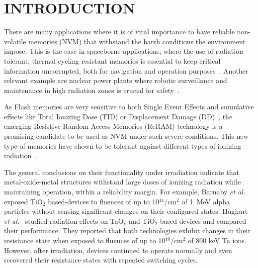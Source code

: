 \documentclass[square,aip,preprint,showkeys,superscriptaddress]{revtex4}
\begin{document}

\maketitle

\section{INTRODUCTION}

There are many applications where it is of vital importance to have reliable non-volatile memories (NVM) that withstand the harsh conditions the environment impose. This is the case in spaceborne applications, where the use of radiation tolerant, thermal cycling resistant memories is essential to keep critical information uncorrupted, both for navigation and operation purposes~\cite{Gerardin10}. Another relevant example are nuclear power plants where robotic surveillance and maintenance in high radiation zones is crucial for safety~\cite{Pegman06,Yoshida14}.

As Flash memories are very sensitive to both Single Event Effects and cumulative effects like Total Ionizing Dose (TID) or Displacement Damage (DD)~\cite{Gerardin13}, the emerging Resistive Random Access Memories (ReRAM) technology is a promising candidate to be used as NVM under such severe conditions. This new type of memories have shown to be tolerant against different types of ionizing radiation~\cite{Chen14,Velo17,Bi18}.

The general conclusions on their functionality under irradiation indicate that metal-oxide-metal structures withstand large doses of ionizing radiation while maintaining operation, within a reliability margin. For example, Barnaby {\textit{et al.}}~\cite{Barnaby13} exposed TiO$_{\mathrm{2}}$ based-devices to fluences of up to 10$^{14}$/cm$^{2}$ of 1~MeV alpha particles without sensing significant changes on their configured states. Hughart {\textit{et al.}}~\cite{Hughart13} studied radiation effects on TaO$_{\mathrm{x}}$ and TiO$_{\mathrm{2}}$-based devices and compared their performance. They reported that both technologies exhibit changes in their resistance state when exposed to fluences of up to 10$^{10}$/cm$^{2}$ of 800 keV Ta ions. However, after irradiation, devices continued to operate normally and even recovered their resistance states with repeated switching cycles. 
\end{document}
